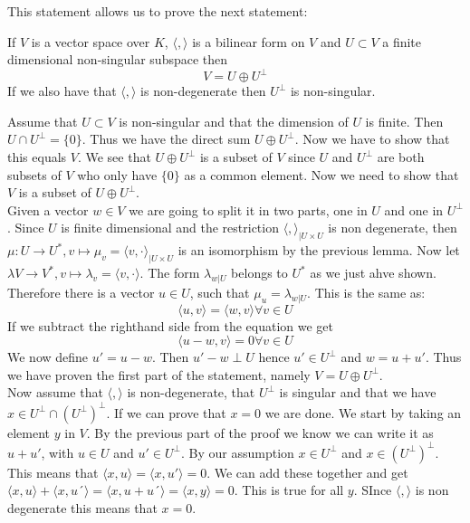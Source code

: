 \documentclass[../Thesis.tex]{subfiles}
\begin{document}
This statement allows us to prove the next statement:
\begin{theorem}
If $V$ is a vector space over $K$, $\langle , \rangle$ is a bilinear form on $V$ and $U \subset V$ a finite dimensional non-singular subspace then 
\begin{equation*}
V = U \oplus U^\perp
\end{equation*}
If we also have that $\langle , \rangle$ is non-degenerate then $U^\perp$ is non-singular.
\end{theorem}
\begin{myproof}
Assume that $U \subset V$ is non-singular and that the dimension of $U$ is finite. Then $U \cap U^\perp = \{0\}$. Thus we have the direct sum $U \oplus U^\perp$. Now we have to show that this equals $V$. We see that $U \oplus U^\perp$ is a subset of $V$ since $U$ and $U^\perp$ are both subsets of $V$ who only have $\{ 0 \}$ as a common element. Now we need to show that $V$ is a subset of $U \oplus U^\perp$.
\\Given a vector $w \in V$ we are going to split it in two parts, one in $U$ and one in $U^\perp$. Since $U$ is finite dimensional and the restriction $\langle , \rangle_{|U \times U}$ is non degenerate, then $\mu : U \rightarrow U^*, v \mapsto \mu_v = \langle v, \cdot \rangle_{| U \times U}$ is an isomorphism by the previous lemma. Now let $\lambda V \rightarrow V^*, v \mapsto \lambda_v = \langle v, \cdot \rangle$. The form $\lambda_{w|U}$ belongs to $U^*$ as we just ahve shown. Therefore there is a vector $u \in U$, such that $\mu_u = \lambda_{w|U}$. This is the same as:
\begin{equation}
\langle u, v\rangle = \langle w, v \rangle \forall v \in U
\end{equation}
If we subtract the righthand side from the equation we get
\begin{equation}
\langle u - w, v \rangle = 0 \forall v \in U
\end{equation}
We now define $u'= u - w$. Then $u' - w \perp U$ hence $u'\in U^\perp$ and $w = u + u'$. Thus we have proven the first part of the statement, namely $V = U \oplus U^\perp$.
\\Now assume that $\langle , \rangle$ is non-degenerate, that $U^\perp$ is singular and that we have $x \in U^\perp \cap (U^\perp)^\perp$. If we can prove that $x = 0$ we are done.  We start by taking an element $y$ in $V$. By the previous part of the proof we know we can write it as $u + u'$, with $u \in U$ and $u'\in U^\perp$. By our assumption $x \in U^\perp$ and $x \in (U^\perp)^\perp$. This means that $\langle x , u\rangle = \langle x , u'\rangle = 0$. We can add these together and get $\langle x , u \rangle + \langle x , u´ \rangle = \langle x , u+ u´  \rangle = \langle x , y \rangle = 0$. This is true for all $y$. SInce $\langle , \rangle$ is non degenerate this means that $x = 0$.
\end{myproof}
\end{document}
